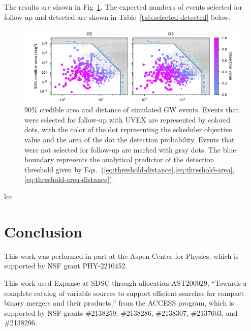 \documentclass[twocolumn,times]{aastex631}
\begin{document}
The results are shown in Fig~\ref{fig:area-distance}. The expected numbers of events selected for follow-up and detected are shown in Table~\ref{tab:selected-detected} below.

\begin{figure}
    \includegraphics[width=\textwidth]{figures/area-distance}
    \caption{\label{fig:area-distance}90\% credible area and distance of simulated \ac{GW} events. Events that were selected for follow-up with \ac{UVEX} are represented by colored dots, with the color of the dot representing the scheduler objective value and the area of the dot the detection probability. Events that were not selected for follow-up are marked with gray dots. The blue boundary represents the analytical predictor of the detection threshold given by Eqs.~(\ref{eq:threshold-distance},\ref{eq:threshold-area},\ref{eq:threshold-area-distance}).}
\end{figure}

\begin{deluxetable}{lcc}
    \startdata
    
    \enddata
\end{deluxetable}

\section{Conclusion}

\begin{acknowledgments}
This work was performed in part at the Aspen Center for Physics, which is supported by \ac{NSF} grant PHY-2210452.

This work used Expanse at \ac{SDSC} through allocation AST200029, ``Towards a complete catalog of variable sources to support efficient searches for compact binary mergers and their products,'' from the \ac{ACCESS} program, which is supported by \ac{NSF} grants \#2138259, \#2138286, \#2138307, \#2137603, and \#2138296.
\end{acknowledgments}

\vspace{5mm}

{}

\end{document}
